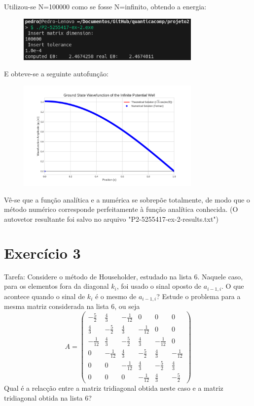 \documentclass[12pt, a4paper]{article} %
\begin{document}
        Utilizou-se N=100000 como se fosse N=infinito, obtendo a energia:
        \begin{figure}[H]
            \centering
            \includegraphics[width=0.8\textwidth]{../images/ex2.png}
        \end{figure}
        E obteve-se a seguinte autofun\c{c}\~ao:
        \begin{figure}[H]
            \centering
            \includegraphics[width=0.8\textwidth]{../images/wavefunction_plot.png}
        \end{figure}

        V\^e-se que a fun\c{c}\~ao anal\'itica e a num\'erica se sobrep\~oe totalmente, de modo que o m\'etodo num\'erico corresponde perfeitamente à fun\c{c}\~ao anal\'itica conhecida. (O autovetor resultante foi salvo no arquivo "P2-5255417-ex-2-results.txt")

    \section{Exerc\'icio 3}

        Tarefa: Considere o m\'etodo de Householder, estudado na lista 6. Naquele caso, para os elementos fora da diagonal $k_{i}$, foi usado o sinal oposto de $a_{i-1,i}$. O que acontece quando o sinal de $k_{i}$ \'e o mesmo de $a_{i-1,i}$? Estude o problema para a mesma matriz considerada na lista 6, ou seja
        \[
        A =
        \begin{pmatrix}
        -\frac{5}{2} & \frac{4}{3} & -\frac{1}{12} & 0 & 0 & 0 \\
        \frac{4}{3} & -\frac{5}{2} & \frac{4}{3} & -\frac{1}{12} & 0 & 0 \\
        -\frac{1}{12} & \frac{4}{3} & -\frac{5}{2} & \frac{4}{3} & -\frac{1}{12} & 0 \\
        0 & -\frac{1}{12} & \frac{4}{3} & -\frac{5}{2} & \frac{4}{3} & -\frac{1}{12} \\
        0 & 0 & -\frac{1}{12} & \frac{4}{3} & -\frac{5}{2} & \frac{4}{3} \\
        0 & 0 & 0 & -\frac{1}{12} & \frac{4}{3} & -\frac{5}{2}
        \end{pmatrix}
        \]
        Qual \'e a relac\c{c}\~ao entre a matriz tridiagonal obtida neste caso e a matriz tridiagonal obtida na lista 6?
        
\end{document}
